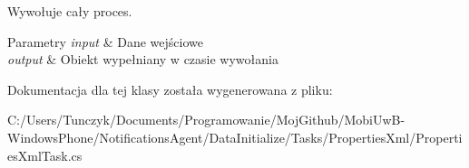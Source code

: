 Wywołuje cały proces. 


\begin{DoxyParams}{Parametry}
{\em input} & Dane wejściowe\\
\hline
{\em output} & Obiekt wypełniany w czasie wywołania\\
\hline
\end{DoxyParams}


Dokumentacja dla tej klasy została wygenerowana z pliku\+:\begin{DoxyCompactItemize}
\item 
C\+:/\+Users/\+Tunczyk/\+Documents/\+Programowanie/\+Moj\+Github/\+Mobi\+Uw\+B-\/\+Windows\+Phone/\+Notifications\+Agent/\+Data\+Initialize/\+Tasks/\+Properties\+Xml/Properties\+Xml\+Task.\+cs\end{DoxyCompactItemize}
